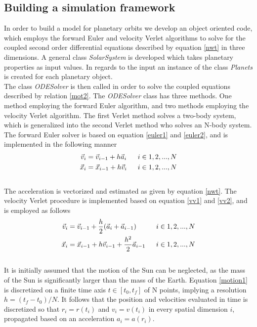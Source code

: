 \documentclass[%
reprint,nofootinbib,
amsmath,amssymb,
aps,
]{revtex4-1}
\begin{document}
\subsection{Building a simulation framework}\noindent
In order to build a model for planetary orbits we develop an object oriented code, which employs the forward Euler and velocity Verlet algorithms to solve for the coupled second order differential equations described by equation \ref{nwt} in three dimensions. A general class \textit{SolarSystem} is developed which takes planetary properties as input values. In regards to the input an instance of the class \textit{Planets} is created for each planetary object. \\ \indent The class \textit{ODESolver} is then called in order to solve the coupled equations described by relation \ref{mot2}. The \textit{ODESolver} class has three methods. One method employing the forward Euler algorithm, and two methods employing the velocity Verlet algorithm. The first Verlet method solves a two-body system, which is generalized into the second Verlet method who solves an N-body system. The forward Euler solver is based on equation \ref{euler1} and \ref{euler2}, and is implemented in the following manner\\ 
\begin{align}
	\vec{v}_i & = \vec{v}_{i-1} + h\vec{a}_i & \hspace{2mm} i \in {1, 2, ..., N} \nonumber\\ 
	\vec{x}_i & = \vec{x}_{i-1} + h\vec{v}_i & \hspace{2mm} i \in {1, 2, ..., N}\nonumber
\end{align} \\ 
The acceleration is vectorized and estimated as given by equation \ref{nwt}. The velocity Verlet procedure is implemented based on equation \ref{vv1} and \ref{vv2}, and is employed as follows \\ 
\begin{align}
	\vec{v}_i &= \vec{v}_{i-1} + \dfrac{h}{2}(\vec{a}_i + \vec{a}_{i-1}) & \hspace{2mm} i \in {1, 2, ..., N} \nonumber\\ 
	\vec{x}_i &= \vec{x}_{i-1} + h\vec{v}_{i-1} + \dfrac{h^2}{2}\vec{a}_{i-1} & \hspace{2mm} i \in {1, 2, ..., N} \nonumber
\end{align} \\ 
It is initially assumed that the motion of the Sun can be neglected, as the mass of the Sun is significantly larger than the mass of the Earth. Equation \ref{motion1} is discretized on a finite time axis $t\in[t_0, t_{f}]$ of N points, implying a resolution $h = (t_f-t_0)/N$. It follows that the position and velocities evaluated in time is discretized so that $r_i = r(t_i)$ and $v_i = v(t_i)$ in every spatial dimension $i$, propagated based on an acceleration $a_{i} = a(r_i)$. \\ \indent 
\end{document}
